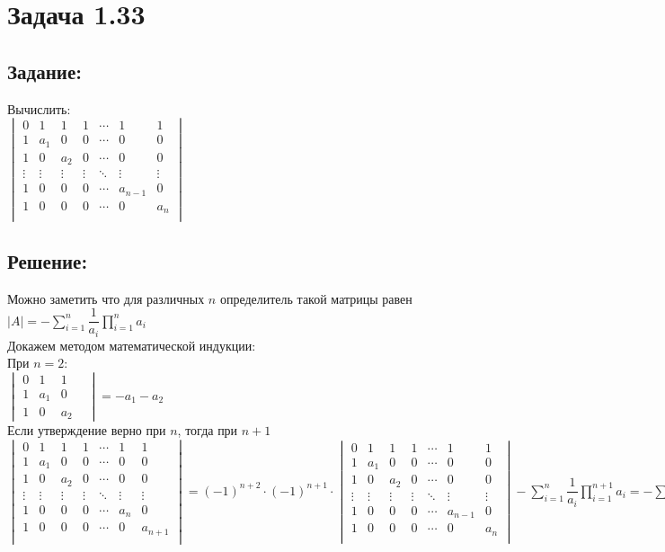 \section{Задача 1.33}
\subsection{Задание:}
Вычислить:
\\[1em]
$
	\begin{vmatrix}
		0 & 1 & 1 & 1 & \cdots & 1 & 1 \\
		1 & a_1 & 0 & 0 & \cdots & 0 & 0 \\
		1 & 0 & a_2 & 0 & \cdots & 0 & 0 \\
		\vdots & \vdots & \vdots & \vdots & \ddots & \vdots & \vdots \\
		1 & 0 & 0 & 0 & \cdots & a_{n-1} & 0 \\
		1 & 0 & 0 & 0 & \cdots & 0 & a_n \\
	\end{vmatrix}
$
\subsection{Решение:}
Можно заметить что для различных $ n $ определитель такой матрицы равен
$ |A| = -\sum \limits_{i=1}^n \dfrac{1}{a_i} \prod \limits_{i=1}^n a_i $
\\
Докажем методом математической индукции:
\\
При $ n = 2 $:
\\
$
	\begin{vmatrix}
		0 & 1 & 1 \\
		1 & a_1 & 0 \\
		1 & 0 & a_2 &
	\end{vmatrix}
	= -a_1 - a_2
$
\\
Если утверждение верно при $ n $, тогда при $ n + 1 $
\\
$
\begin{vmatrix}
	0 & 1 & 1 & 1 & \cdots & 1 & 1 \\
	1 & a_1 & 0 & 0 & \cdots & 0 & 0 \\
	1 & 0 & a_2 & 0 & \cdots & 0 & 0 \\
	\vdots & \vdots & \vdots & \vdots & \ddots & \vdots & \vdots \\
	1 & 0 & 0 & 0 & \cdots & a_{n} & 0 \\
	1 & 0 & 0 & 0 & \cdots & 0 & a_{n+1} \\
\end{vmatrix}
= (-1)^{n+2} \cdot (-1)^{n+1} \cdot
\begin{vmatrix}
	0 & 1 & 1 & 1 & \cdots & 1 & 1 \\
	1 & a_1 & 0 & 0 & \cdots & 0 & 0 \\
	1 & 0 & a_2 & 0 & \cdots & 0 & 0 \\
	\vdots & \vdots & \vdots & \vdots & \ddots & \vdots & \vdots \\
	1 & 0 & 0 & 0 & \cdots & a_{n-1} & 0 \\
	1 & 0 & 0 & 0 & \cdots & 0 & a_n \\
\end{vmatrix}
- \sum \limits_{i=1}^n \dfrac{1}{a_i} \prod \limits_{i=1}^{n+1} a_i =
- \sum \limits_{i=1}^{n+1} \dfrac{1}{a_i} \prod \limits_{i=1}^{n+1} a_i
$
